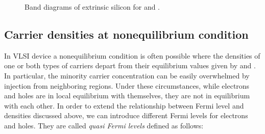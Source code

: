 \begin{figure}[!h]
\centering
{}
\caption{Band diagrams of extrinsic silicon for  and .}
\label{fig: Band diagrams of extrinsic silicon}
\end{figure}

\subsection{Carrier densities at nonequilibrium condition}

In VLSI device a nonequilibrium condition is often possible where the densities of one or both types of carriers depart from their equilibrium values given by  and .
In particular, the minority carrier concentration can be easily overwhelmed by injection from neighboring regions. Under these circumstances, while electrons and holes are in local equilibrium with themselves, they are not in equilibrium with each other. In order to extend the relationship between Fermi level and densities discussed above, we can introduce different Fermi levels for electrons and holes. They are called \textit{quasi Fermi levels} defined as follows:


